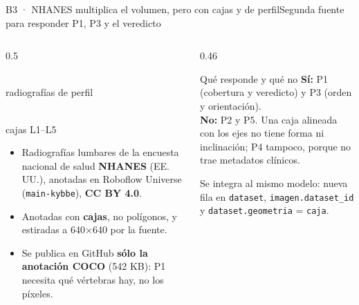\documentclass[aspectratio=169,10pt]{beamer}
\newcommand{\dato}[2]{\begin{minipage}[t]{2.6cm}\centering{\Huge\bfseries\color{itba}#1}\\[0.6ex]{\footnotesize\color{gris}#2}\end{minipage}}
\begin{document}
\begin{frame}{B3 · NHANES multiplica el volumen, pero con cajas y de perfil}{Segunda fuente para responder P1, P3 y el veredicto}
  \begin{columns}[T]
    \begin{column}{0.5\textwidth}
      \begin{center}
        \dato{4.436}{radiografías de perfil}\dato{22.185}{cajas L1–L5}
      \end{center}
      \small
      \begin{itemize}\setlength{\itemsep}{0.5ex}
        \item Radiografías lumbares de la encuesta nacional de salud \textbf{NHANES} (EE.\,UU.), anotadas en Roboflow Universe (\texttt{main-kybbe}), \textbf{CC BY 4.0}.
        \item Anotadas con \textbf{cajas}, no polígonos, y estiradas a 640$\times$640 por la fuente.
        \item Se publica en GitHub \textbf{sólo la anotación COCO} (542 KB): P1 necesita qué vértebras hay, no los píxeles.
      \end{itemize}
    \end{column}
    \begin{column}{0.46\textwidth}
      \begin{block}{Qué responde y qué no}
        \footnotesize
        \textbf{Sí:} P1 (cobertura y veredicto) y P3 (orden y orientación).\\[0.4ex]
        \textbf{No:} P2 y P5. Una caja alineada con los ejes no tiene forma ni inclinación; P4 tampoco, porque no trae metadatos clínicos.
      \end{block}
      \vspace{0.6ex}
      \footnotesize\color{gris}Se integra al mismo modelo: nueva fila en \texttt{dataset}, \texttt{imagen.dataset\_id} y \texttt{dataset.geometria} = \texttt{caja}.
    \end{column}
  \end{columns}
\end{frame}
\end{document}

